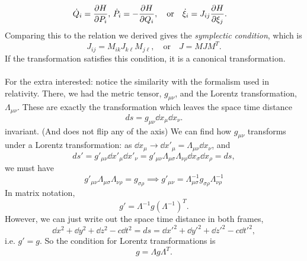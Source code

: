 \documentclass{article}
\begin{document}
        \begin{align*}
            &\dot Q_i = \pdv{H}{P_i}, \, \dot P_i = -\pdv{H}{Q_i}, \quad \mathrm{or} \quad \dot \xi_i = J_{ij} \pdv{H}{\xi_j}.
        \end{align*}
        Comparing this to the relation we derived gives the \emph{symplectic condition}, which is 
        \begin{equation*}
            J_{ij} =  M_{ik} J_{k\ell} M_{j \ell}, \quad \mathrm{or} \quad J = M J M^T.
        \end{equation*}
        If the transformation satisfies this condition, it is a canonical transformation. \\ \\
        For the extra interested: notice the similarity with the formalism used in relativity. There, we had the metric tensor, $g_{\mu \nu}$, and the Lorentz transformation, $\Lambda_{\mu \nu}$. These are exactly the transformation which leaves the space time distance 
        \begin{equation*}
            ds = g_{\mu \nu} \dd x_\mu \dd x_\nu.
        \end{equation*}
        invariant. (And does not flip any of the axis) We can find how $g_{\mu \nu}$ transforms under a Lorentz transformation: as $\dd x_\mu \rightarrow \dd x'_\mu = \Lambda_{\mu \nu} \dd x_\nu$, and
        \begin{equation*}
            ds' = g'_{\mu \nu} \dd x'_\mu \dd x'_\nu = g'_{\mu \nu} \Lambda_{\mu \sigma} \Lambda_{\nu \rho}\dd x_\sigma \dd x_\rho = ds,
        \end{equation*}
        we must have
        \begin{equation*}
            g'_{\mu \nu} \Lambda_{\mu \sigma} \Lambda_{\nu \rho} = g_{\sigma \rho} \implies g'_{\mu \nu} = \Lambda_{\mu \sigma}^{-1} g_{\sigma \rho} \Lambda_{\nu \rho}^{-1}
        \end{equation*}
        In matrix notation,
        \begin{equation*}
            g' = \Lambda^{-1} g (\Lambda^{-1})^T.
        \end{equation*}
        However, we can just write out the space time distance in both frames, 
        \begin{equation*}
            \dd x^2 + \dd y^2 + \dd z^2 - c \dd t^2 = ds = \dd x'^2 + \dd y'^2 + \dd z'^2 - c \dd t'^2,
        \end{equation*}
        i.e. $g' = g$. So the condition for Lorentz transformations is 
        \begin{equation*}
            g = \Lambda g \Lambda^T.
        \end{equation*}
        
\end{document}
